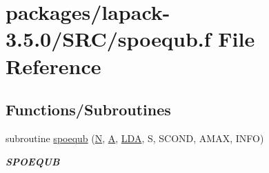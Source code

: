 \hypertarget{spoequb_8f}{}\section{packages/lapack-\/3.5.0/\+S\+R\+C/spoequb.f File Reference}
\label{spoequb_8f}
\subsection*{Functions/\+Subroutines}
\begin{DoxyCompactItemize}
\item 
subroutine \hyperlink{group__realPOcomputational_gafe38c1fc8fe05c782f06f59157bdc389}{spoequb} (\hyperlink{polmisc_8c_a0240ac851181b84ac374872dc5434ee4}{N}, \hyperlink{classA}{A}, \hyperlink{example__user_8c_ae946da542ce0db94dced19b2ecefd1aa}{L\+D\+A}, S, S\+C\+O\+N\+D, A\+M\+A\+X, I\+N\+F\+O)
\begin{DoxyCompactList}\small\item\em {\bfseries S\+P\+O\+E\+Q\+U\+B} \end{DoxyCompactList}\end{DoxyCompactItemize}
